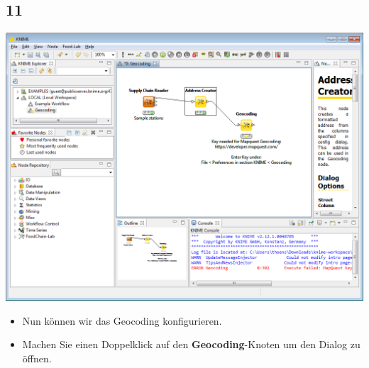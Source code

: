 \documentclass{beamer}
\begin{document}
\subsection{11}
\begin{frame}
	\begin{center}
  		\includegraphics[height=0.6\textheight]{11.png}
	\end{center}
	\begin{itemize}
		\item Nun können wir das Geocoding konfigurieren.
		\item Machen Sie einen Doppelklick auf den \textbf{Geocoding}-Knoten um den Dialog zu öffnen.
	\end{itemize}
\end{frame}
\end{document}
